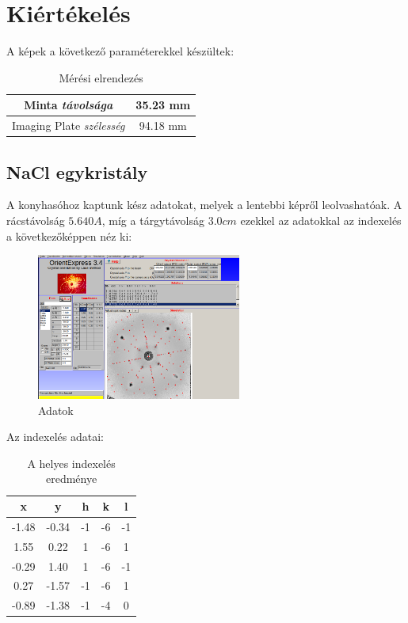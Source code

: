 \documentclass[a4paper,12pt]{article}
\begin{document}
\section{ Kiértékelés}

\par A képek a következő paraméterekkel készültek:

\begin{table}[H]
	\centering
	\begin{tabular}{|c||c|}  \hline
		Minta \textit{távolsága}         & 35.23 mm \\ \hline
		Imaging Plate \textit{szélesség} & 94.18 mm \\ \hline
	\end{tabular}
	\caption{Mérési elrendezés}
\end{table}

\subsection{ NaCl egykristály}

\par A konyhasóhoz kaptunk kész adatokat, melyek a lentebbi képről
leolvashatóak. A rácstávolság $5.640 A$, míg a tárgytávolság $3.0 cm$
ezekkel az adatokkal az indexelés a következőképpen néz ki:

\begin{figure}[H]
	\centering
	\includegraphics[width=0.6\textwidth]{NaCl-indexed-data.png}
	\caption{Adatok}
\end{figure}

\par Az indexelés adatai:

\begin{table}[H]
	\centering
	\begin{tabular}{|c|c||c|c|c|}  \hline
		x     & y     & h  & k  & l  \\ \hline
		-1.48 & -0.34 & -1 & -6 & -1 \\ \hline
		1.55  & 0.22  & 1  & -6 & 1  \\ \hline
		-0.29 & 1.40  & 1  & -6 & -1 \\ \hline
		0.27  & -1.57 & -1 & -6 & 1  \\ \hline
		-0.89 & -1.38 & -1 & -4 & 0  \\ \hline
	\end{tabular}
	\caption{A helyes indexelés eredménye}
\end{table}
\end{document}
